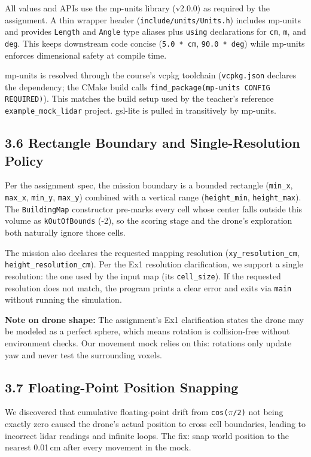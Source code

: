 \documentclass[12pt,a4paper]{article}
\begin{document}
All values and APIs use the mp-units library (v2.0.0) as required by the
assignment. A thin wrapper header (\texttt{include/units/Units.h}) includes
mp-units and provides \texttt{Length} and \texttt{Angle} type aliases plus
\texttt{using} declarations for \texttt{cm}, \texttt{m}, and \texttt{deg}.
This keeps downstream code concise (\texttt{5.0 * cm}, \texttt{90.0 * deg})
while mp-units enforces dimensional safety at compile time.

mp-units is resolved through the course's vcpkg toolchain
(\texttt{vcpkg.json} declares the dependency; the CMake build calls
\texttt{find\_package(mp-units CONFIG REQUIRED)}). This matches the
build setup used by the teacher's reference \texttt{example\_mock\_lidar}
project. gsl-lite is pulled in transitively by mp-units.

\subsection{3.6 Rectangle Boundary and Single-Resolution Policy}

Per the assignment spec, the mission boundary is a bounded rectangle
(\texttt{min\_x}, \texttt{max\_x}, \texttt{min\_y}, \texttt{max\_y}) combined
with a vertical range (\texttt{height\_min}, \texttt{height\_max}). The
\texttt{BuildingMap} constructor pre-marks every cell whose center falls
outside this volume as \texttt{kOutOfBounds} (-2), so the scoring stage and
the drone's exploration both naturally ignore those cells.

The mission also declares the requested mapping resolution
(\texttt{xy\_resolution\_cm}, \texttt{height\_resolution\_cm}). Per the Ex1
resolution clarification, we support a single resolution: the one used by
the input map (its \texttt{cell\_size}). If the requested resolution does
not match, the program prints a clear error and exits via \texttt{main}
without running the simulation.

\textbf{Note on drone shape:} The assignment's Ex1 clarification states the
drone may be modeled as a perfect sphere, which means rotation is
collision-free without environment checks. Our movement mock relies on
this: rotations only update yaw and never test the surrounding voxels.

\subsection{3.7 Floating-Point Position Snapping}

We discovered that cumulative floating-point drift from \texttt{cos($\pi$/2)}
not being exactly zero caused the drone's actual position to cross cell
boundaries, leading to incorrect lidar readings and infinite loops. The fix:
snap world position to the nearest 0.01\,cm after every movement in the mock.
\end{document}
